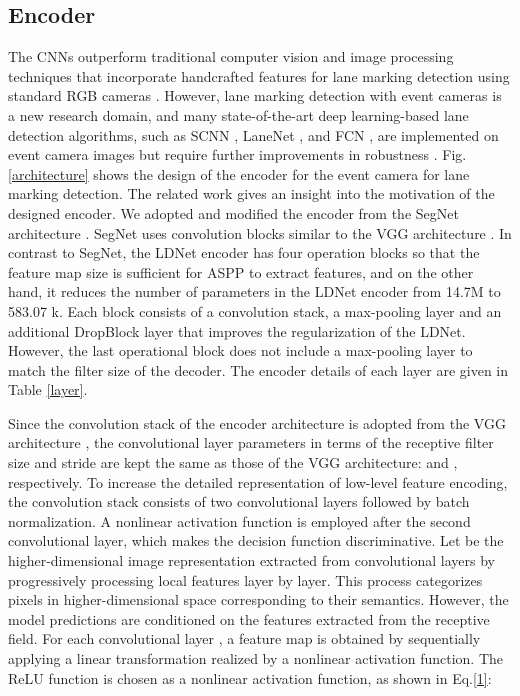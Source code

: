 \documentclass[journal]{IEEEtran}
\begin{document}
\subsection{Encoder}
The CNNs outperform traditional computer vision and image processing techniques that incorporate handcrafted features for lane marking detection using standard RGB cameras \cite{Wu2014} \cite{Deng2013} \cite{Caceres2016}. However, lane marking detection with event cameras is a new research domain, and many state-of-the-art deep learning-based lane detection algorithms, such as SCNN \cite{Pan2017}, LaneNet \cite{Wang2018}, and FCN \cite{Long2015}, are implemented on event camera images but require further improvements in robustness \cite{Cheng2019}. 
Fig.\ref{architecture} shows the design of the encoder for the event camera for lane marking detection. The related work gives an insight into the motivation of the designed encoder. We adopted and modified the encoder from the SegNet architecture \cite{badrinarayanan2017segnet}. SegNet  uses convolution blocks similar to the VGG architecture \cite{vgg}. In contrast to SegNet, the LDNet encoder has four operation blocks so that the feature map size is sufficient for ASPP to extract features, and on the other hand, it reduces the number of parameters in the LDNet encoder from 14.7M to 583.07 k.  Each block consists of a convolution stack,  a max-pooling layer and an additional DropBlock layer that improves the regularization of the LDNet. However, the last operational block does not include a max-pooling layer to match the filter size of the decoder. The encoder details of each layer are given in Table \ref{layer}.
\par
Since the convolution stack of the encoder architecture is adopted from the VGG architecture \cite{vgg}, the convolutional layer parameters in terms of the receptive filter size and stride are kept the same as those of the VGG architecture:  and , respectively. To increase the detailed representation of low-level feature encoding, the convolution stack consists of two convolutional layers followed by batch normalization. A nonlinear activation function is employed after the second convolutional layer, which makes the decision function discriminative. Let  be the higher-dimensional image representation extracted from convolutional layers by progressively processing local features layer by layer. This process categorizes pixels in higher-dimensional space corresponding to their semantics. However, the model predictions are conditioned on the features extracted from the receptive field. For each convolutional layer , a feature map  is obtained by sequentially applying a linear transformation realized by a nonlinear activation function. The ReLU function is chosen as a nonlinear activation function, as shown in Eq.\ref{1}:
\end{document}
